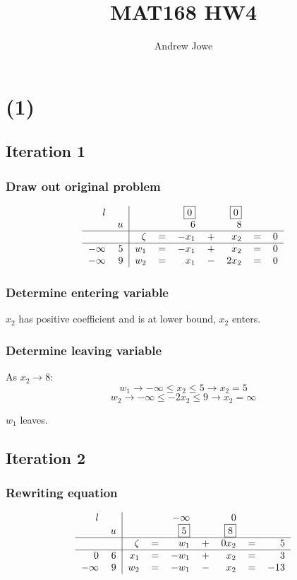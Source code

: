 \documentclass[14pt]{extarticle}
\title{MAT168 HW4}
\author{Andrew Jowe}
\begin{document}
\maketitle
\section*{(1)}
\subsection*{Iteration 1}
\subsubsection*{Draw out original problem}
\[\begin{tabular}{r r|r r r r r r r}
    $l$ & & & & \fbox{0} & & \fbox{0} & & \\
    & $u$ & & & 6 & & 8 & & \\
    \hline
    & & $\zeta$ & $=$ & $-x_1$ & $+$ & $x_2$ & $=$ & $0$ \\
    \hline
    $-\infty$ & $5$ & $w_1$ & $=$ & $-x_1$ & $+$ & $x_2$ & $=$ & $0$ \\
    $-\infty$ & $9$ & $w_2$ & $=$ & $x_1$ & $-$ & $2x_2$ & $=$ & $0$ \\
\end{tabular}\]

\subsubsection*{Determine entering variable}
$x_2$ has positive coefficient and is at lower bound, $x_2$ enters.

\subsubsection*{Determine leaving variable}
As $x_2 \to 8$:
\[w_1 \to -\infty \leq x_2 \leq 5 \to x_2 = 5\]
\[w_2 \to -\infty \leq -2x_2 \leq 9 \to x_2 = \infty\]

\bigskip $w_1$ leaves.

\subsection*{Iteration 2}
\subsubsection*{Rewriting equation}
\[\begin{tabular}{r r|r r r r r r r}
    $l$ & & & & $-\infty$ & & 0 & & \\
    & $u$ & & & \fbox{5} & & \fbox{8} & & \\
    \hline
    & & $\zeta$ & $=$ & $w_1$ & $+$ & $0x_2$ & $=$ & $5$ \\
    \hline
    $0$ & $6$ & $x_1$ & $=$ & $-w_1$ & $+$ & $x_2$ & $=$ & $3$ \\
    $-\infty$ & $9$ & $w_2$ & $=$ & $-w_1$ & $-$ & $x_2$ & $=$ & $-13$ \\
\end{tabular}\]
\end{document}
